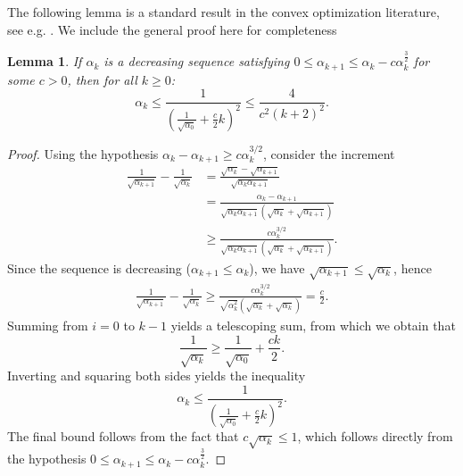 \documentclass{article}
\theoremstyle{plain}
\newtheorem{lemma}[theorem]{Lemma}
\theoremstyle{definition}
\theoremstyle{remark}
\begin{document}
The following lemma is a standard result in the convex optimization literature, see e.g. \cite{2006CubicRegularizationOfNewtonMethodAndItsGlobalPerformance}. We include the general proof here for completeness

\begin{lemma}\label{lemmaAlpha3div2Recursion}
    If $\alpha_k$ is a decreasing sequence satisfying $0 \leq \alpha_{k+1} \leq \alpha_k - c\alpha_k^{\frac{3}{2}}$ for some $c>0$, then for all $k \geq 0$:
    \begin{equation}
        \alpha_k \leq \frac{1}{\left( \frac{1}{\sqrt{\alpha_0}} + \frac{c}{2}k \right)^2} \leq \frac{4}{c^2 (k + 2)^2}.
    \end{equation}
\end{lemma}
\begin{proof}
    Using the hypothesis $\alpha_k - \alpha_{k+1} \geq c \alpha_k^{3/2}$, consider the increment
    \begin{align}
        \frac{1}{\sqrt{\alpha_{k+1}}} - \frac{1}{\sqrt{\alpha_k}}
        &= \frac{\sqrt{\alpha_k} - \sqrt{\alpha_{k+1}}}{\sqrt{\alpha_k \alpha_{k+1}}} \\
        &= \frac{\alpha_k - \alpha_{k+1}}{\sqrt{\alpha_k \alpha_{k+1}} (\sqrt{\alpha_k} + \sqrt{\alpha_{k+1}})} \\
        &\geq \frac{c \alpha_k^{3/2}}{\sqrt{\alpha_k \alpha_{k+1}} (\sqrt{\alpha_k} + \sqrt{\alpha_{k+1}})}.
    \end{align}
    Since the sequence is decreasing ($\alpha_{k+1} \leq \alpha_k$), we have $\sqrt{\alpha_{k+1}} \leq \sqrt{\alpha_k}$, hence
    \begin{align}
        \frac{1}{\sqrt{\alpha_{k+1}}} - \frac{1}{\sqrt{\alpha_k}}
        \geq \frac{c \alpha_k^{3/2}}{\sqrt{\alpha_k^2} (\sqrt{\alpha_k} + \sqrt{\alpha_k})}
        = \frac{c}{2}.
    \end{align}
    Summing from $i=0$ to $k-1$ yields a telescoping sum, from which we obtain that
    \begin{equation}
        \frac{1}{\sqrt{\alpha_k}} \geq \frac{1}{\sqrt{\alpha_0}} + \frac{ck}{2}.
    \end{equation}
    Inverting and squaring both sides yields the inequality
    \begin{equation}
        \alpha_k \leq \frac{1}{\left( \frac{1}{\sqrt{\alpha_0}} + \frac{c}{2}k \right)^2}.
    \end{equation}
    The final bound follows from the fact that $c\sqrt{\alpha_k} \leq 1$, which follows directly from the hypothesis $0 \leq \alpha_{k+1} \leq \alpha_k - c\alpha_k^{\frac{3}{2}}$.
\end{proof}
\end{document}
